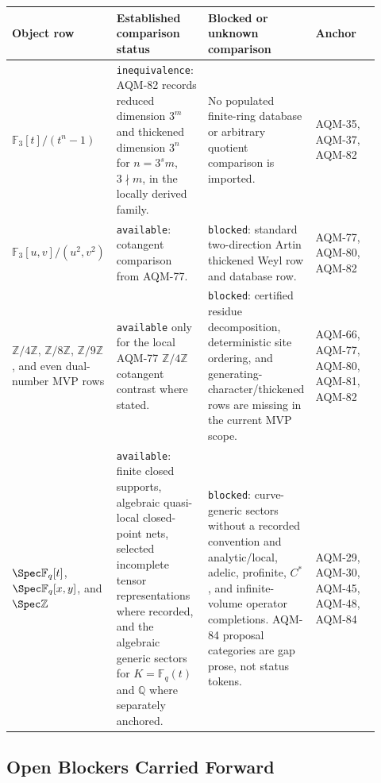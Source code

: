 \begin{center}
\scriptsize\setlength{\tabcolsep}{3pt}
\begin{tabular}{p{0.19\linewidth}p{0.26\linewidth}p{0.25\linewidth}p{0.22\linewidth}}
\toprule
Object row & Established comparison status & Blocked or unknown comparison & Anchor \\
\midrule
\(\mathbb F_3[t]/(t^n-1)\) &
\texttt{inequivalence}: AQM-82 records reduced dimension \(3^m\) and
thickened dimension \(3^n\) for \(n=3^s m\), \(3\nmid m\), in the locally
derived family. &
No populated finite-ring database or arbitrary quotient comparison is
imported. &
AQM-35, AQM-37, AQM-82 \\
\addlinespace
\(\mathbb F_3[u,v]/(u^2,v^2)\) &
\texttt{available}: cotangent comparison from AQM-77. &
\texttt{blocked}: standard two-direction Artin thickened Weyl row and
database row. &
AQM-77, AQM-80, AQM-82 \\
\addlinespace
\(\mathbb Z/4\mathbb Z\), \(\mathbb Z/8\mathbb Z\),
\(\mathbb Z/9\mathbb Z\), and even dual-number MVP rows &
\texttt{available} only for the local AQM-77 \(\mathbb Z/4\mathbb Z\)
cotangent contrast where stated. &
\texttt{blocked}: certified residue decomposition, deterministic site
ordering, and generating-character/thickened rows are missing in the current
MVP scope. &
AQM-66, AQM-77, AQM-80, AQM-81, AQM-82 \\
\addlinespace
\(\Spec\mathbb F_q[t]\), \(\Spec\mathbb F_q[x,y]\), and \(\Spec\mathbb Z\) &
\texttt{available}: finite closed supports, algebraic quasi-local
closed-point nets, selected incomplete tensor representations where recorded,
and the algebraic generic sectors for \(K=\mathbb F_q(t)\) and
\(\mathbb Q\) where separately anchored. &
\texttt{blocked}: curve-generic sectors without a recorded convention and
analytic/local, adelic, profinite, \(C^*\), and infinite-volume operator
completions.  AQM-84 proposal categories are gap prose, not status tokens. &
AQM-29, AQM-30, AQM-45, AQM-48, AQM-84 \\
\bottomrule
\end{tabular}
\end{center}

\subsection{Open Blockers Carried Forward}

